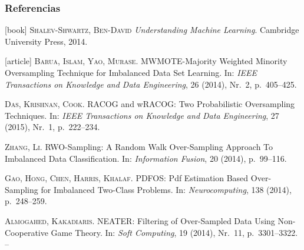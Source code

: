 \begin{frame}\frametitle{Referencias}
 \fontsize{8pt}{0}\selectfont
 \vspace{2em}
 \begin{thebibliography}{99}
  [book]
     \textsc{Shalev-Shwartz, Ben-David}
     \newblock \emph{Understanding Machine Learning}.
     \newblock Cambridge University Press, 2014.
   
   [article]
     \textsc{Barua, Islam, Yao, Murase}.
     \newblock MWMOTE-Majority Weighted Minority Oversampling Technique for
       Imbalanced Data Set Learning.
     \newblock In: \emph{IEEE Transactions on Knowledge and Data Engineering}, 26 (2014), Nr.~2, p.~405--425.

     \textsc{Das, Krishnan, Cook}.
     \newblock RACOG and wRACOG: Two Probabilistic Oversampling Techniques.
     \newblock In: \emph{IEEE Transactions on Knowledge and Data Engineering}, 27 (2015), Nr.~1, p.~222--234.
   
     \textsc{Zhang, Li}.
     \newblock RWO-Sampling: A Random Walk Over-Sampling Approach To Imbalanced Data Classification.
     \newblock In: \emph{Information Fusion}, 20 (2014), p.~99--116.
     
     \textsc{Gao, Hong, Chen, Harris, Khalaf}.
     \newblock PDFOS: Pdf Estimation Based Over-Sampling for Imbalanced Two-Class Problems.
     \newblock In: \emph{Neurocomputing}, 138 (2014), p.~248--259.
     
     \textsc{Almogahed, Kakadiaris}.
     \newblock NEATER: Filtering of Over-Sampled Data Using Non-Cooperative Game Theory.
     \newblock In: \emph{Soft Computing}, 19 (2014), Nr.~11, p.~3301--3322. --

 \end{thebibliography}
\end{frame}